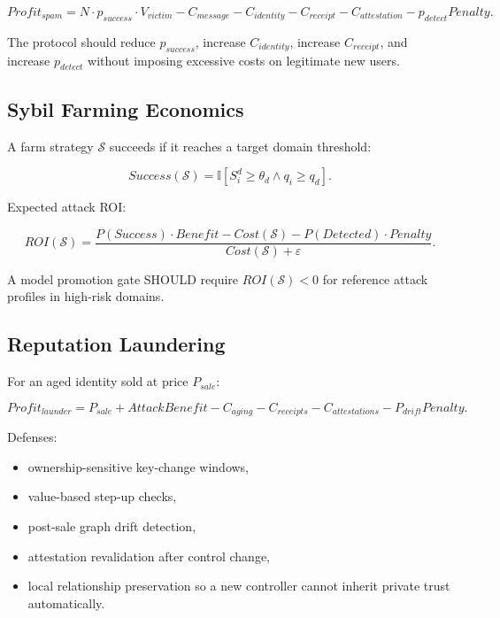 \documentclass[11pt]{article}
\begin{document}
\begin{equation}
Profit_{spam}=N\cdot p_{success}\cdot V_{victim}-C_{message}-C_{identity}-C_{receipt}-C_{attestation}-p_{detect}Penalty.
\end{equation}

The protocol should reduce \(p_{success}\), increase \(C_{identity}\), increase \(C_{receipt}\), and increase \(p_{detect}\) without imposing excessive costs on legitimate new users.

\subsection{Sybil Farming Economics}

A farm strategy \(\mathcal{S}\) succeeds if it reaches a target domain threshold:

\begin{equation}
Success(\mathcal{S})=\mathbb{I}[S_i^d\geq \theta_d \land q_i\geq q_d].
\end{equation}

Expected attack ROI:

\begin{equation}
ROI(\mathcal{S})=\frac{P(Success)\cdot Benefit-Cost(\mathcal{S})-P(Detected)\cdot Penalty}{Cost(\mathcal{S})+\varepsilon}.
\end{equation}

A model promotion gate SHOULD require \(ROI(\mathcal{S})<0\) for reference attack profiles in high-risk domains.

\subsection{Reputation Laundering}

For an aged identity sold at price \(P_{sale}\):

\begin{equation}
Profit_{launder}=P_{sale}+AttackBenefit-C_{aging}-C_{receipts}-C_{attestations}-P_{drift}Penalty.
\end{equation}

Defenses:

\begin{itemize}
    \item ownership-sensitive key-change windows,
    \item value-based step-up checks,
    \item post-sale graph drift detection,
    \item attestation revalidation after control change,
    \item local relationship preservation so a new controller cannot inherit private trust automatically.
\end{itemize}
\end{document}
